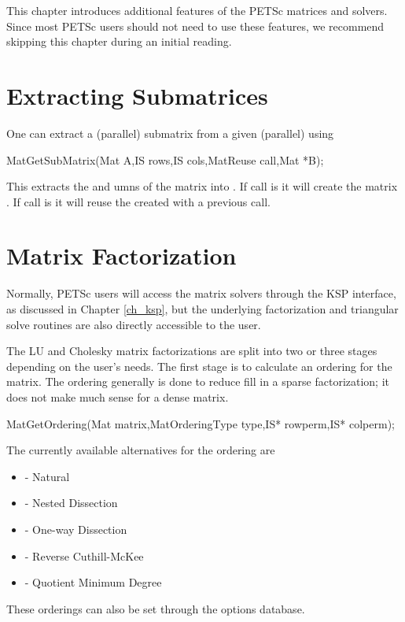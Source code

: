 {{This chapter introduces additional features of the PETSc matrices and solvers.
Since most PETSc users should not need to use these features,
we recommend skipping this chapter during an initial reading.

\medskip \medskip

\section{Extracting Submatrices} 

One can extract a (parallel) submatrix from a given (parallel) using
\begin{tabbing}
  MatGetSubMatrix(Mat A,IS rows,IS cols,MatReuse call,Mat *B);
\end{tabbing}
This extracts the  and umns of the matrix  into . If
call is    it will create the matrix
. If call is   it will reuse the 
created with a previous call.

\medskip \medskip

\section{Matrix Factorization} 
\label{sec_matfactor}

Normally, PETSc users will access the matrix solvers through the
KSP interface, as discussed in Chapter \ref{ch_ksp}, but the underlying
factorization and triangular solve routines are also directly
accessible to the user.

\medskip \medskip

The LU and Cholesky 
matrix factorizations are split into 
two or three stages depending on the user's needs. The first stage is
to calculate an ordering for the matrix.  The ordering generally is
done to reduce fill in a sparse factorization; it does not make much
sense for a dense matrix.  
\begin{tabbing}
  MatGetOrdering(Mat matrix,MatOrderingType type,IS* rowperm,IS* colperm);
\end{tabbing}
The currently available alternatives for the ordering  are
\begin{itemize}
\item {} - Natural
\item {} - Nested Dissection
\item {} - One-way Dissection
\item {} - Reverse Cuthill-McKee
\item {} - Quotient Minimum Degree
\end{itemize}
These orderings can also be set through the options database.

}}
